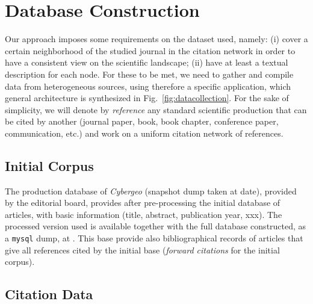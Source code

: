 \section*{Database Construction}
\label{sec:data}



Our approach imposes some requirements on the dataset used, namely: (i) cover a certain neighborhood of the studied journal in the citation network in order to have a consistent view on the scientific landscape; (ii) have at least a textual description for each node. For these to be met, we need to gather and compile data from heterogeneous sources, using therefore a specific application, which general architecture is synthesized in Fig.~\ref{fig:datacollection}. For the sake of simplicity, we will denote by \emph{reference} any standard scientific production that can be cited by another (journal paper, book, book chapter, conference paper, communication, etc.) and work on a uniform citation network of references.



\subsection*{Initial Corpus}

The production database of \textit{Cybergeo} (snapshot dump taken at date), provided by the editorial board, provides after pre-processing the initial database of articles, with basic information (title, abstract, publication year, xxx). The processed version used is available together with the full database constructed, as a \texttt{mysql} dump, at \texttt{}. This base provide also bibliographical records of articles that give all references cited by the initial base (\emph{forward citations} for the initial corpus).



\subsection*{Citation Data}

